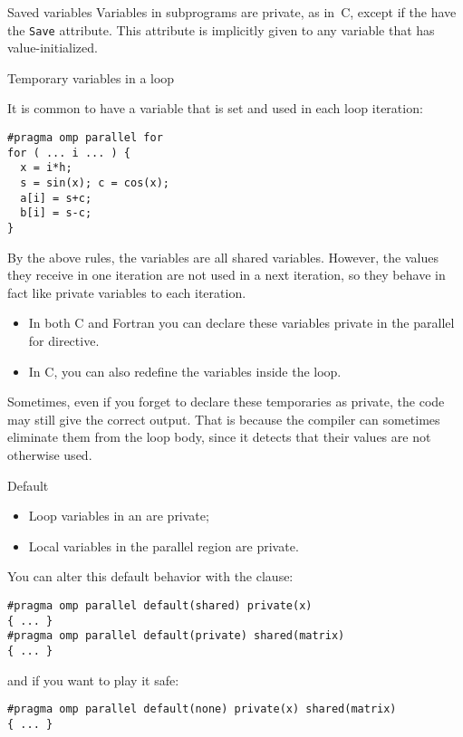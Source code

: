 \begin{fortrannote}{Saved variables}
  Variables in subprograms are private, as in~C,
  except if the have the \lstinline{Save} attribute.
  This attribute is implicitly given to any variable
  that has value-initialized.
\end{fortrannote}

 {Temporary variables in a loop}

It is common to have a variable that is set and used in each loop
iteration:
\begin{lstlisting}
#pragma omp parallel for
for ( ... i ... ) {
  x = i*h;
  s = sin(x); c = cos(x);
  a[i] = s+c;
  b[i] = s-c;
}
\end{lstlisting}
By the above rules, the variables  are all shared
variables. However, the values they receive in one iteration are not
used in a next iteration, so they behave in fact like private
variables to each iteration.
\begin{itemize}
\item In both C and Fortran you can declare these variables private in
  the parallel for directive.
\item In C, you can also redefine the variables inside the loop.
\end{itemize}

Sometimes, even if you forget to declare these temporaries as private,
the code may still give the correct output. That is because the
compiler can sometimes eliminate them from the loop body, since it detects that their
values are not otherwise used.

 {Default}

\begin{itemize}
\item Loop variables in an  are private;
\item Local variables in the parallel region are private.
\end{itemize}
You can alter this default behavior with the  clause:
\begin{lstlisting}
#pragma omp parallel default(shared) private(x)
{ ... }
#pragma omp parallel default(private) shared(matrix)
{ ... }
\end{lstlisting}
and if you want to play it safe:
\begin{lstlisting}
#pragma omp parallel default(none) private(x) shared(matrix)
{ ... }
\end{lstlisting}

